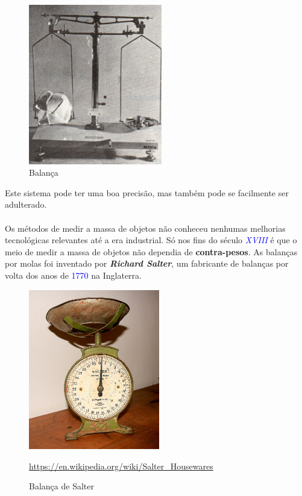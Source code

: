 \begin{minipage}[!b]{0.45\linewidth}
	\begin{figure}[H]
		\centering
		\includegraphics[height=7cm]{./image/PESTA/general/balanca_4.jpg}
		\caption{Balança}
		\label{balanca_4}
	\end{figure}
\end{minipage}
\newline
\newline
\newline
Este sistema pode ter uma boa precisão, mas também pode se facilmente ser adulterado.
\\
\\
Os métodos de medir a massa de objetos não conheceu nenhumas melhorias tecnológicas relevantes até a era industrial. Só nos fins do século \textcolor{blue}{\textit{XVIII}} é que o meio de medir a massa de objetos não dependia de \textbf{contra-pesos}. As balanças por molas foi inventado por \textbf{\textit{Richard Salter}}, um fabricante de balanças por volta dos anos de \textcolor{blue}{1770} na Inglaterra.\\
\begin{figure}[H]
	\centering
	\includegraphics[height=7cm]{./image/PESTA/general/Weigh_Scale_Salter_1.jpg}
	\caption{Balança de Salter}
	\url{https://en.wikipedia.org/wiki/Salter_Housewares}
	\label{Weigh_Scale_Salter_1}
\end{figure}
